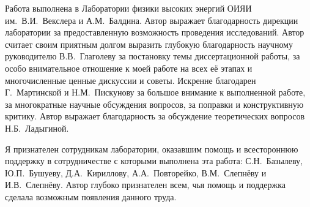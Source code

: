 \vfill
Работа выполнена в Лаборатории физики высоких энергий ОИЯИ им.~В.И.~Векслера и
А.М.~Балдина. Автор выражает благодарность дирекции лаборатории за
предоставленную возможность проведения исследований.
Автор считает своим приятным долгом выразить глубокую благодарность научному
руководителю В.В.~Глаголеву за постановку темы диссертационной работы, за особо
внимательное отношение к моей работе на всех её этапах и многочисленные ценные
дискуссии и советы. Искренне благодарен Г.~Мартинской и Н.М.~Пискунову за
большое внимание к выполненной работе, за многократные научные обсуждения
вопросов, за поправки и конструктивную критику. Автор выражает благодарность за
обсуждение теоретических вопросов Н.Б.~Ладыгиной.

Я признателен сотрудникам лаборатории, оказавшим помощь и всестороннюю поддержку
в сотрудничестве с которыми выполнена эта работа: С.Н.~Базылеву, Ю.П.~Бушуеву,
Д.А.~Кириллову, А.А.~Повторейко, В.М.~Слепнёву и И.В.~Слепнёву.
Автор глубоко признателен всем, чья помощь и поддержка сделала возможным
появления данного труда.

